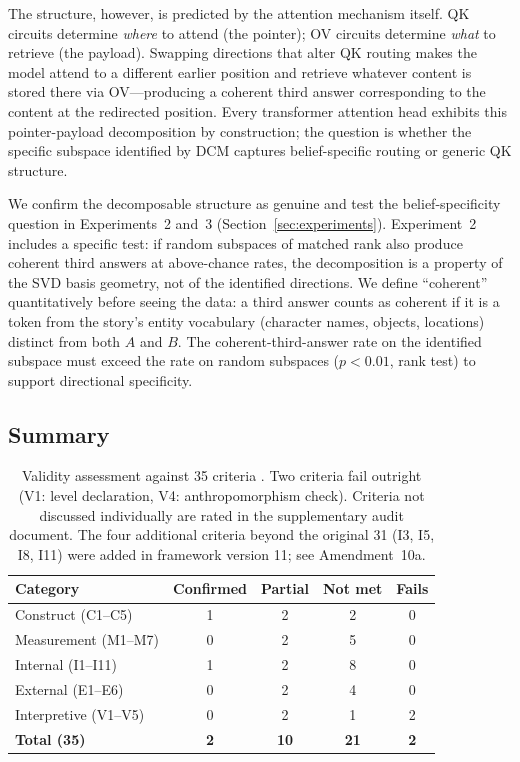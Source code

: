 \documentclass[11pt]{article}
\begin{document}
The structure, however, is predicted by the attention mechanism itself. QK circuits determine \emph{where} to attend (the pointer); OV circuits determine \emph{what} to retrieve (the payload). Swapping directions that alter QK routing makes the model attend to a different earlier position and retrieve whatever content is stored there via OV---producing a coherent third answer corresponding to the content at the redirected position. Every transformer attention head exhibits this pointer-payload decomposition by construction; the question is whether the specific subspace identified by DCM captures belief-specific routing or generic QK structure.

We confirm the decomposable structure as genuine and test the belief-specificity question in Experiments~2 and~3 (Section~\ref{sec:experiments}). Experiment~2 includes a specific test: if random subspaces of matched rank also produce coherent third answers at above-chance rates, the decomposition is a property of the SVD basis geometry, not of the identified directions. We define ``coherent'' quantitatively before seeing the data: a third answer counts as coherent if it is a token from the story's entity vocabulary (character names, objects, locations) distinct from both $A$ and $B$. The coherent-third-answer rate on the identified subspace must exceed the rate on random subspaces ($p < 0.01$, rank test) to support directional specificity.

\subsection{Summary}

\begin{table}[t]
\centering
\caption{Validity assessment against 35 criteria \citep{tower2026mechval}. Two criteria fail outright (V1: level declaration, V4: anthropomorphism check). Criteria not discussed individually are rated in the supplementary audit document. The four additional criteria beyond the original 31 (I3, I5, I8, I11) were added in framework version 11; see Amendment~10a.}
\label{tab:validity}
\begin{tabular}{lcccc}
\toprule
Category & Confirmed & Partial & Not met & Fails \\
\midrule
Construct (C1--C5) & 1 & 2 & 2 & 0 \\
Measurement (M1--M7) & 0 & 2 & 5 & 0 \\
Internal (I1--I11) & 1 & 2 & 8 & 0 \\
External (E1--E6) & 0 & 2 & 4 & 0 \\
Interpretive (V1--V5) & 0 & 2 & 1 & 2 \\
\midrule
\textbf{Total (35)} & \textbf{2} & \textbf{10} & \textbf{21} & \textbf{2} \\
\bottomrule
\end{tabular}
\end{table}
\end{document}
